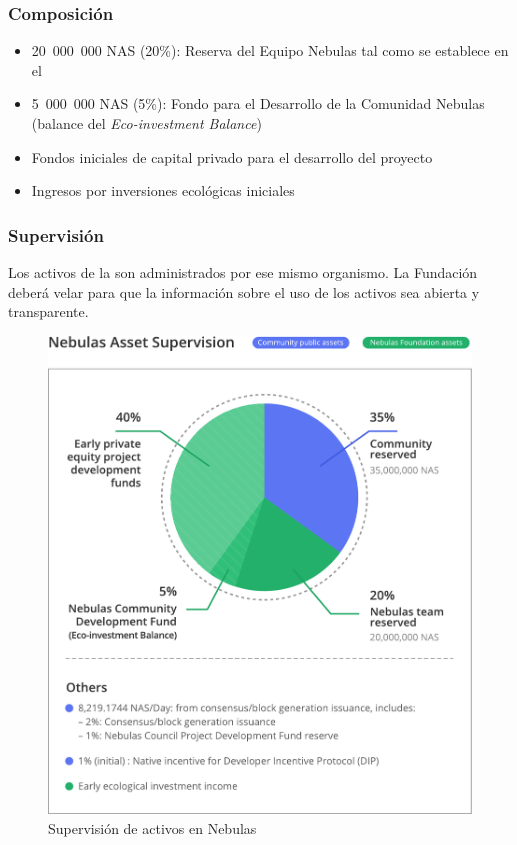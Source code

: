 \subsubsection{Composición}

\begin{itemize}
	\item 20 000 000 NAS (20\%): Reserva del Equipo Nebulas tal como se establece en el \ntechw
    \item 5 000 000 NAS (5\%): Fondo para el Desarrollo de la Comunidad Nebulas (balance del \textit{Eco-investment Balance})
	\item Fondos iniciales de capital privado para el desarrollo del proyecto
	\item Ingresos por inversiones ecológicas iniciales
\end{itemize}

\subsubsection{Supervisión}

Los activos de la \fundneb son administrados por ese mismo organismo. La Fundación deberá velar para que la información sobre el uso de los activos sea abierta y transparente.

\begin{figure}
	\centering
	\includegraphics[width=1\textwidth]{../common/en/assets.pdf}
	\caption{Supervisión de activos en Nebulas \label{fig:assets}}
\end{figure}